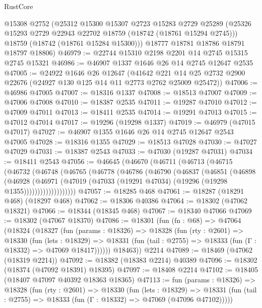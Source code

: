 \begin{lexlean}{RustCore}
\begin{coremodule}
      @15308
      @2752
      (@25312
        @15300
        @15307
        @2723
        @15283
        @2729
        @25289
        (@25326 @15293 @2729 @22943 @22702 @18759 (@18742 (@18761 @15294 @2745)))
        @18759
        (@18742 (@18761 @15284 @15300)))
      @18777
      @18781
      @18786
      @18791
      @18797
      @18806)
@46979 := @22744 @15310 @2198 @2201 @14 @2745 @15315 @2745 @15321
@46986 := @46907 @1337 @1646 @26 @14 @2745 @12647 @2535
@47005 := @24922
    @1646
    @26
    @12647
    (@41642 @221 @14 @25 @2732 @2900 @22676 (@24927 @130 @125 @14 @11 @2773 @2762 @25009 @25472))
@47006 := @46986 @47005
@47007 := @18316 @1337
@47008 := @18513 @47007
@47009 := @47006 @47008
@47010 := @18387 @2535
@47011 := @19287 @47010
@47012 := @47009 @47011
@47013 := @18411 @2535
@47014 := @19291 @47013
@47015 := @47012 @47014
@47017 := @19296 (@19298 @1337)
@47019 := @46979 (@47015 @47017)
@47027 := @46907 @1355 @1646 @26 @14 @2745 @12647 @2543 @47005
@47028 := @18316 @1355
@47029 := @18513 @47028
@47030 := @47027 @47029
@47031 := @18387 @2543
@47033 := @47030 (@19287 @47031)
@47034 := @18411 @2543
@47056 := @46645
    (@46670
      (@46711
        (@46713
          (@46715
            (@46732
              (@46748
                (@46765
                  (@46778
                    (@46786
                      (@46790
                        (@46837
                          (@46851
                            (@46898
                              (@46928
                                (@46971
                                  (@47019
                                    (@47033 (@19291 @47034) (@19296 (@19298 @1355)))))))))))))))))))
@47057 := @18285 @468
@47061 := @18287 (@18291 @468) (@18297 @468)
@47062 := @18306 @40386
@47064 := @18302 (@47062 @18321)
@47066 := @18344 (@18345 @468)
@47067 := @18340 @47066
@47069 := @18302 (@47067 @18370)
@47086 := @18301
    (fun (fn : @68) =>
    @47064
      (@18324
        (@18327
          (fun (params : @18326) =>
          @18328
            (fun (rty : @2601) =>
            @18330
              (fun (lets : @18329) =>
              @18331 (fun (tail : @2755) => @18333 (fun (Γ : @18332) => @47069 @18417))))))
        @18463))
    @2214
@47089 := @18469 (@47062 (@18319 @2214))
@47092 := @18382 (@18383 @2214) @40389
@47096 := @18302 (@18374 (@47092 @18391) @18395)
@47097 := @18408 @2214
@47102 := @18405 (@18407 @47097 @40392 @18363 @18365)
@47113 := fun (params : @18326) =>
  @18328
    (fun (rty : @2601) =>
    @18330
      (fun (lets : @18329) =>
      @18331 (fun (tail : @2755) => @18333 (fun (Γ : @18332) => @47069 (@47096 @47102)))))

\end{coremodule}
\end{lexlean}
